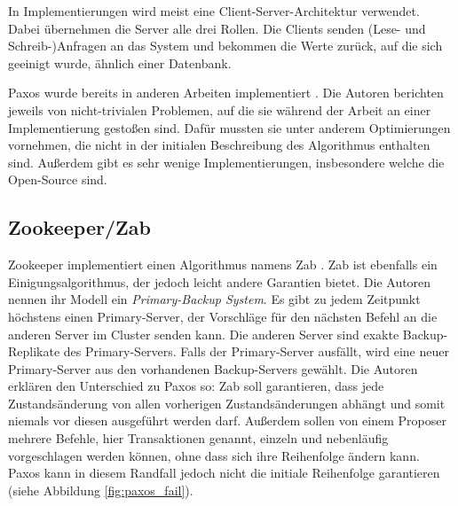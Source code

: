 In Implementierungen wird meist eine Client-Server-Architektur verwendet. Dabei übernehmen die Server alle drei Rollen. Die Clients senden (Lese- und Schreib-)Anfragen an das System und bekommen die Werte zurück, auf die sich geeinigt wurde, ähnlich einer Datenbank.

Paxos wurde bereits in anderen Arbeiten implementiert \cite{paxos-made-code, paxos-made-live}. Die Autoren berichten jeweils von nicht-trivialen Problemen, auf die sie während der Arbeit an einer Implementierung gestoßen sind. Dafür mussten sie unter anderem Optimierungen vornehmen, die nicht in der initialen Beschreibung des Algorithmus enthalten sind. Außerdem gibt es sehr wenige Implementierungen, insbesondere welche die Open-Source sind.

\subsection{Zookeeper/Zab}


Zookeeper implementiert einen Algorithmus namens Zab \cite{zab}. Zab ist ebenfalls ein Einigungsalgorithmus, der jedoch leicht andere Garantien bietet. Die Autoren nennen ihr Modell ein \textit{Primary-Backup System}. Es gibt zu jedem Zeitpunkt höchstens einen Primary-Server, der Vorschläge für den nächsten Befehl an die anderen Server im Cluster senden kann. Die anderen Server sind exakte Backup-Replikate des Primary-Servers. Falls der Primary-Server ausfällt, wird eine neuer Primary-Server aus den vorhandenen Backup-Servers gewählt. Die Autoren erklären den Unterschied zu Paxos so: Zab soll garantieren, dass jede Zustandsänderung von allen vorherigen Zustandsänderungen abhängt und somit niemals vor diesen ausgeführt werden darf. Außerdem sollen von einem Proposer mehrere Befehle, hier Transaktionen genannt, einzeln und nebenläufig vorgeschlagen werden können, ohne dass sich ihre Reihenfolge ändern kann. Paxos kann in diesem Randfall jedoch nicht die initiale Reihenfolge garantieren (siehe Abbildung \ref{fig:paxos_fail}).

